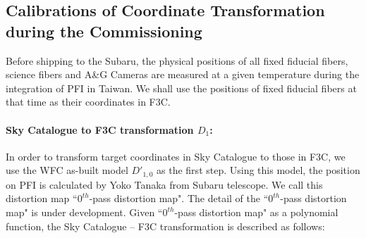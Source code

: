 \subsection{Calibrations of Coordinate Transformation during the Commissioning}\label{sec:coord_calib}

Before shipping to the Subaru, the physical positions of all fixed fiducial fibers, science fibers and A\&G Cameras are measured at a given temperature during the integration of PFI in Taiwan.
We shall use the positions of fixed fiducial fibers at that time as their coordinates in F3C.

\paragraph{Sky Catalogue to F3C transformation $D_1$:}
In order to transform target coordinates in Sky Catalogue to those in F3C, we use the WFC as-built model $D'_{1,0}$ as the first step.
Using this model, the position on PFI is calculated by Yoko Tanaka from Subaru telescope.
We call this distortion map ``$0^{th}$-pass distortion map".
The detail of the ``$0^{th}$-pass distortion map" is under development.
Given ``$0^{th}$-pass distortion map" as a polynomial function, the Sky Catalogue -- F3C transformation is described as follows:
